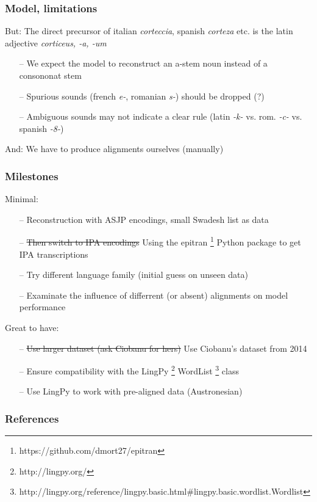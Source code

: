 \documentclass[11pt]{beamer}
\begin{document}
\begin{frame}
    \frametitle{Model, limitations}
    But: The direct precursor of italian \textit{corteccia}, spanish \textit{corteza} etc. is the latin adjective \textit{corticeus, -a, -um}
    \begin{itemize}
        \item[--] We expect the model to reconstruct an a-stem noun instead of a consononat stem 
        \item[--] Spurious sounds (french \textit{e-}, romanian \textit{s-}) should be dropped (?)
        \item[--] Ambiguous sounds may not indicate a clear rule (latin \textit{-k-} vs. rom. \textit{-c-} vs. spanish \textit{-8-})  
    \end{itemize}
    And: We have to produce alignments ourselves (manually)
\end{frame}

\begin{frame}
    \frametitle{Milestones}
    Minimal:
    \begin{itemize}
        \item[--] Reconstruction with ASJP encodings, small Swadesh list as data 
        \item[--] \sout{Then switch to IPA encodings}  Using the epitran \footnote{https://github.com/dmort27/epitran} Python package to get IPA transcriptions
        \item[--] Try different language family (initial guess on unseen data)
        \item[--] Examinate the influence of differrent (or absent) alignments on model performance  
    \end{itemize}    
    Great to have:
    \begin{itemize}
        \item[--] \sout{Use larger dataset (ask Ciobanu for hers)} Use Ciobanu's dataset from 2014
        \item[--] Ensure compatibility with the LingPy \footnote{http://lingpy.org/} WordList 
        \footnote{http://lingpy.org/reference/lingpy.basic.html\#lingpy.basic.wordlist.Wordlist} class
        \item[--] Use LingPy to work with pre-aligned data (Austronesian)
    \end{itemize}
\end{frame}

\begin{frame}
    \frametitle{References}
    
\end{frame}
\end{document}
